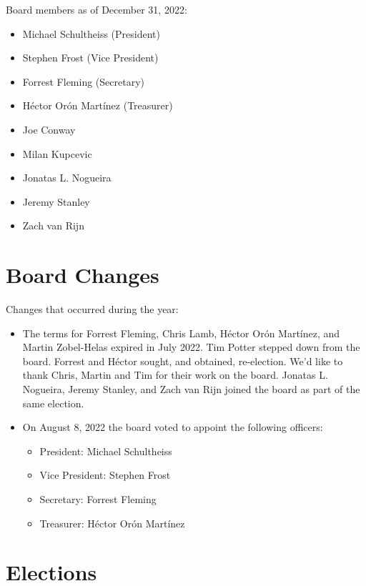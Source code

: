 \documentclass[a4paper]{report}
\begin{document}
Board members as of December 31, 2022:

\begin{itemize}
\item Michael Schultheiss (President)
\item Stephen Frost (Vice President)
\item Forrest Fleming (Secretary)
\item Héctor Orón Martínez (Treasurer)
\item Joe Conway
\item Milan Kupcevic
\item Jonatas L. Nogueira
\item Jeremy Stanley
\item Zach van Rijn
\end{itemize}

\section{Board Changes}

Changes that occurred during the year:

\begin{itemize}

\item The terms for Forrest Fleming, Chris Lamb, Héctor Orón Martínez, and Martin Zobel-Helas expired in July 2022.  Tim Potter stepped down from the board.  Forrest and Héctor sought, and obtained, re-election.  We'd like to thank Chris, Martin and Tim for their work on the board.  Jonatas L. Nogueira, Jeremy Stanley, and Zach van Rijn joined the board as part of the same election.

\item On August 8, 2022 the board voted to appoint the following officers:

\begin{itemize}
\item President: Michael Schultheiss
\item Vice President: Stephen Frost
\item Secretary: Forrest Fleming
\item Treasurer: Héctor Orón Martínez
\end{itemize}

\end{itemize}

\section{Elections}
\end{document}
